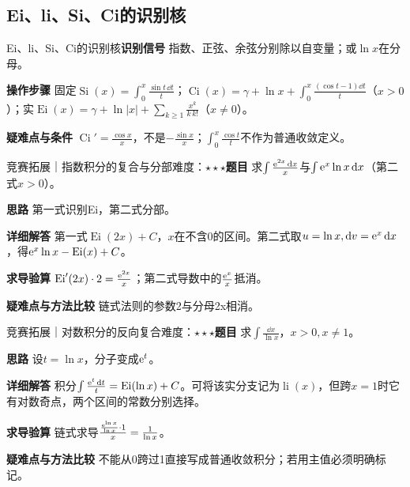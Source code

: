 \subsection{Ei、li、Si、Ci的识别核}\label{ic:indefinite_special_complete:ei}\begin{method}{Ei、li、Si、Ci的识别核}\textbf{识别信号} 指数、正弦、余弦分别除以自变量；或$\ln x$在分母。\par \textbf{操作步骤} 固定$\operatorname{Si}(x)=\int_0^x\frac{\sin t\,\dd t}{t}$；$\operatorname{Ci}(x)=\gamma+\ln x+\int_0^x\frac{(\cos t-1)\dd t}{t}$（$x>0$）；实$\operatorname{Ei}(x)=\gamma+\ln|x|+\sum_{k\ge1}\frac{x^k}{k\,k!}$（$x\ne0$）。\par \textbf{疑难点与条件} $\operatorname{Ci}'=\frac{\cos x}{x}$，不是$-\frac{\sin x}{x}$；$\int_0^x\frac{\cos t}{t}$不作为普通收敛定义。\end{method}

\begin{example}{竞赛拓展｜指数积分的复合与分部}{难度：$\star\star\star$}\label{ic:ex:indefinite_special_complete:ei_scaling}\textbf{题目} 求$\int\frac{\mathrm{e}^{2x}\mathop{}\!\mathrm{d} x}{x}$与$\int\mathrm{e}^x\ln x\mathop{}\!\mathrm{d} x$（第二式$x>0$）。\par \textbf{思路} 第一式识别Ei，第二式分部。\par \textbf{详细解答} 第一式$\operatorname{Ei}(2x)+C$，$x$在不含0的区间。第二式取$u=\ln x,\mathop{}\!\mathrm{d} v=\mathrm{e}^x\mathop{}\!\mathrm{d} x$，得$\mathrm{e}^x\ln x-\operatorname{Ei}(x)+C$。\par \textbf{求导验算} $\operatorname{Ei}'(2x)\cdot2=\frac{\mathrm{e}^{2x}}{x}$；第二式导数中的$\frac{\mathrm{e}^x}{x}$抵消。\par \textbf{疑难点与方法比较} 链式法则的参数2与分母2x相消。\end{example}

\begin{example}{竞赛拓展｜对数积分的反向复合}{难度：$\star\star\star$}\label{ic:ex:indefinite_special_complete:li}\textbf{题目} 求$\int\frac{\dd x}{\ln x}$，$x>0,x\ne1$。\par \textbf{思路} 设$t=\ln x$，分子变成$\mathrm{e}^t$。\par \textbf{详细解答} 积分$\int\frac{\mathrm{e}^t\mathop{}\!\mathrm{d} t}{t}=\operatorname{Ei}(\ln x)+C$。可将该实分支记为$\operatorname{li}(x)$，但跨$x=1$时它有对数奇点，两个区间的常数分别选择。\par \textbf{求导验算} 链式求导$\frac{\frac{\mathrm{e}^{\ln x}}{\ln x}\cdot1}{x}=\frac{1}{\ln x}$。\par \textbf{疑难点与方法比较} 不能从0跨过1直接写成普通收敛积分；若用主值必须明确标记。\end{example}

